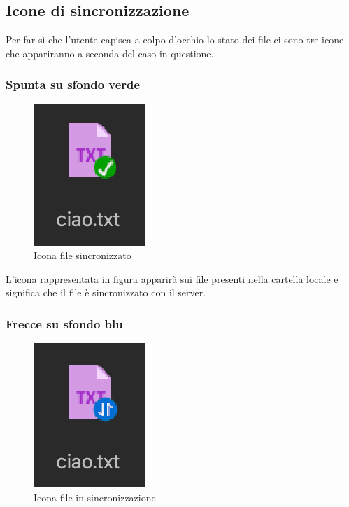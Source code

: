 \subsection{Icone di sincronizzazione}
\label{sec:iconeSync}
Per far sì che l'utente capisca a colpo d'occhio lo stato dei file ci sono tre icone che appariranno a seconda del caso in questione.
\subsubsection{Spunta su sfondo verde}

\begin{figure}[H]
    \centering
    \includegraphics[scale = 0.8]{components/img/iconIsSync.png}
    \caption{Icona file sincronizzato}
    \label{fig:greenI}
\end{figure}

L'icona rappresentata in figura apparirà sui file presenti nella cartella locale e significa che il file è sincronizzato con il server.
\subsubsection{Frecce su sfondo blu}

\begin{figure}[H]
    \centering
    \includegraphics[scale = 1.6]{components/img/iconSync.png}
    \caption{Icona file in sincronizzazione}
    \label{fig:bluedownI}
\end{figure}

